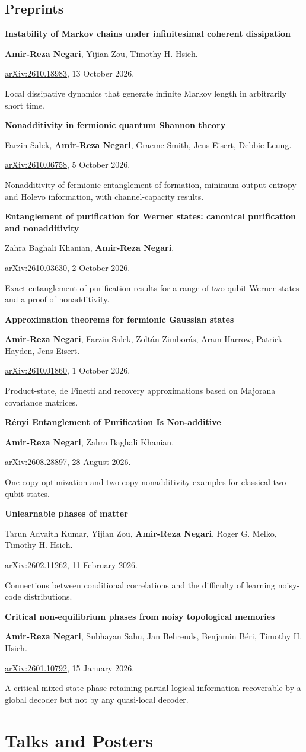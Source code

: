 \documentclass[10pt,letterpaper]{article}
\newcommand{\me}{\textbf{Amir-Reza Negari}}
\newcommand{\paper}[5]{\needspace{60pt}\noindent\makebox[20pt][l]{\textcolor{muted}{#1.}}\begin{minipage}[t]{\dimexpr\linewidth-20pt\relax}\raggedright\textbf{#2}\par #3\par #4\par{\color{muted}#5}\end{minipage}\par\vspace{3pt}}
\begin{document}
\subsection{Preprints}
\paper{7}{Instability of Markov chains under infinitesimal coherent dissipation}
{\me, Yijian Zou, Timothy H. Hsieh.}
{\href{https://arxiv.org/abs/2610.18983}{arXiv:2610.18983}, 13 October 2026.}
{Local dissipative dynamics that generate infinite Markov length in arbitrarily short time.}
\paper{8}{Nonadditivity in fermionic quantum Shannon theory}
{Farzin Salek, \me, Graeme Smith, Jens Eisert, Debbie Leung.}
{\href{https://arxiv.org/abs/2610.06758}{arXiv:2610.06758}, 5 October 2026.}
{Nonadditivity of fermionic entanglement of formation, minimum output entropy and Holevo information, with channel-capacity results.}
\paper{9}{Entanglement of purification for Werner states: canonical purification and nonadditivity}
{Zahra Baghali Khanian, \me.}
{\href{https://arxiv.org/abs/2610.03630}{arXiv:2610.03630}, 2 October 2026.}
{Exact entanglement-of-purification results for a range of two-qubit Werner states and a proof of nonadditivity.}
\paper{10}{Approximation theorems for fermionic Gaussian states}
{\me, Farzin Salek, Zolt\'an Zimbor\'as, Aram Harrow, Patrick Hayden, Jens Eisert.}
{\href{https://arxiv.org/abs/2610.01860}{arXiv:2610.01860}, 1 October 2026.}
{Product-state, de Finetti and recovery approximations based on Majorana covariance matrices.}
\paper{11}{R\'enyi Entanglement of Purification Is Non-additive}
{\me, Zahra Baghali Khanian.}
{\href{https://arxiv.org/abs/2608.28897}{arXiv:2608.28897}, 28 August 2026.}
{One-copy optimization and two-copy nonadditivity examples for classical two-qubit states.}
\paper{12}{Unlearnable phases of matter}
{Tarun Advaith Kumar, Yijian Zou, \me, Roger G. Melko, Timothy H. Hsieh.}
{\href{https://arxiv.org/abs/2602.11262}{arXiv:2602.11262}, 11 February 2026.}
{Connections between conditional correlations and the difficulty of learning noisy-code distributions.}
\paper{13}{Critical non-equilibrium phases from noisy topological memories}
{\me, Subhayan Sahu, Jan Behrends, Benjamin B\'eri, Timothy H. Hsieh.}
{\href{https://arxiv.org/abs/2601.10792}{arXiv:2601.10792}, 15 January 2026.}
{A critical mixed-state phase retaining partial logical information recoverable by a global decoder but not by any quasi-local decoder.}

\clearpage
\section{Talks and Posters}
\end{document}
